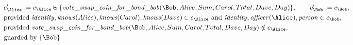 \begin{align*}
&
c'_
{
\Alice
}
 := 
c_
{
\Alice
}
 \uplus 
\{
\mathit{\detokenize{
vote_swap_coin_for_bond_bob
}}
(
\Bob
,
Alice
,
Sum
,
Carol
,
Total
,
Dave
,
Day
)
\}
, \qquad 
c'_
{
\Bob
}
 := 
c_
{
\Bob
}
,\\
&
\text{provided } 
\mathit{\detokenize{
identity
}}
,
\mathit{\detokenize{
knows
}}
(
Alice
)
,
\mathit{\detokenize{
knows
}}
(
Carol
)
,
\mathit{\detokenize{
knows
}}
(
Dave
)
 \in c_
{
\Alice
}
 \text{ and } 
\mathit{\detokenize{
identity
}}
,
\mathit{\detokenize{
officer
}}
(
\Alice
)
,
\mathit{\detokenize{
person
}}
 \in c_
{
\Bob
}
,\\
&
\text{provided } 
\mathit{\detokenize{
vote_swap_coin_for_bond_bob
}}
(
\Bob
,
Alice
,
Sum
,
Carol
,
Total
,
Dave
,
Day
)
 \notin c_
{
\Alice
}
,\\
&
\text{guarded by } \{
\Bob
\}
\end{align*}

